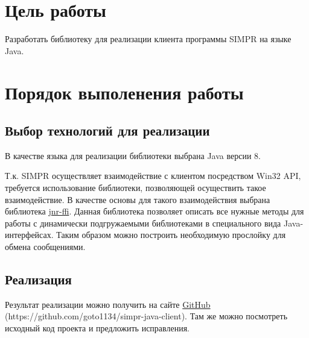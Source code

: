 	\section{Цель работы}
	Разработать библиотеку для реализации клиента программы SIMPR на языке Java.
		
	\section{Порядок выполенения работы}
 		\subsection{Выбор технологий для реализации}
 			В качестве языка для реализации библиотеки выбрана Java версии 8. 
		   
			Т.к. SIMPR осуществляет взаимодействие с клиентом посредством Win32 API, требуется использование библиотеки, позволяющей осуществить такое взаимодействие. 
			В качестве основы для такого взаимодействия выбрана библиотека \href{https://github.com/jnr/jnr-ffi}{jnr-ffi}.
			Данная библиотека позволяет описать все нужные методы для работы с динамически подгружаемыми библиотеками в специального вида Java-интерфейсах. 
			Таким образом можно построить необходимую прослойку для обмена сообщениями.

	 	\subsection{Реализация}
	 		Результат реализации можно получить на сайте \href{https://github.com/goto1134/simpr-java-client}{GitHub} (https://github.com/goto1134/simpr-java-client). 
	 		Там же можно посмотреть исходный код проекта и предложить исправления.
	 		

